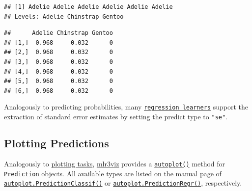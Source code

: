 \documentclass[
]{scrbook}
\newenvironment{Shaded}{\begin{snugshade}}{\end{snugshade}}
\newcommand{\CommentTok}[1]{\textcolor[rgb]{0.56,0.35,0.01}{\textit{#1}}}
\newcommand{\FunctionTok}[1]{\textcolor[rgb]{0.00,0.00,0.00}{#1}}
\newcommand{\NormalTok}[1]{#1}
\newcommand{\SpecialCharTok}[1]{\textcolor[rgb]{0.00,0.00,0.00}{#1}}
\renewenvironment{Shaded} {\begin{snugshade}\small} {\end{snugshade}}
\begin{document}
\begin{Shaded}
\end{Shaded}

\begin{verbatim}
## [1] Adelie Adelie Adelie Adelie Adelie Adelie
## Levels: Adelie Chinstrap Gentoo
\end{verbatim}

\begin{Shaded}
\end{Shaded}

\begin{verbatim}
##      Adelie Chinstrap Gentoo
## [1,]  0.968     0.032      0
## [2,]  0.968     0.032      0
## [3,]  0.968     0.032      0
## [4,]  0.968     0.032      0
## [5,]  0.968     0.032      0
## [6,]  0.968     0.032      0
\end{verbatim}

Analogously to predicting probabilities, many \href{https://mlr3.mlr-org.com/reference/LearnerRegr.html}{\texttt{regression\ learners}} support the extraction of standard error estimates by setting the predict type to \texttt{"se"}.

\hypertarget{autoplot-prediction}{%
\subsection{Plotting Predictions}\label{autoplot-prediction}}

Analogously to \protect\hyperlink{autoplot-task}{plotting tasks}, \href{https://mlr3viz.mlr-org.com}{mlr3viz} provides a \href{https://www.rdocumentation.org/packages/ggplot2/topics/autoplot}{\texttt{autoplot()}} method for \href{https://mlr3.mlr-org.com/reference/Prediction.html}{\texttt{Prediction}} objects.
All available types are listed on the manual page of \href{https://mlr3viz.mlr-org.com/reference/autoplot.PredictionClassif.html}{\texttt{autoplot.PredictionClassif()}} or \href{https://mlr3viz.mlr-org.com/reference/autoplot.PredictionRegr.html}{\texttt{autoplot.PredictionRegr()}}, respectively.
\end{document}
